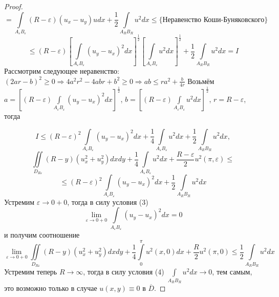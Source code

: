 \documentclass[a4paper, 11pt]{article}
\begin{document}
\begin{proof}
		\begin{equation*}
			= \int\limits_{A_\varepsilon B_\varepsilon} \left(R - \varepsilon \right) \left(u_x - u_y\right)u dx + \dfrac12  \int\limits_{A_R B_R} u^2 dx \leq \{ \text{Неравенство Коши-Буняковского} \}
		\end{equation*}
		\begin{equation*}
			\leq \left(R - \varepsilon\right) \left[\int\limits_{A_\varepsilon B_\varepsilon} \left( u_y - u_x\right)^2 dx \right]^{\frac12} \left[\int\limits_{A_\varepsilon B_\varepsilon} u^2 dx \right]^{\frac12} + \dfrac12 \int\limits_{A_RB_R} u^2 dx = I
		\end{equation*}
		Рассмотрим следующее неравенство: \begin{math}
			\left(2ar -b\right)^2 \geq 0 \Rightarrow 4a^2 r^2 - 4 abr + b^2 \geq 0 \Rightarrow ab \leq r a^2 + \frac{b}{4r}
		\end{math}
	\newline
		Возьмём $ a = \left[ \left(R - \varepsilon \right) \int\limits_{A_\varepsilon B_\varepsilon} \left( u_y - u_x\right)^2 dx \right]^{\frac12}$, $ b = \left[\left(R - \varepsilon\right)\int\limits_{A_\varepsilon B_\varepsilon} u^2 dx \right]^{\frac12}$, $ r = R - \varepsilon$, тогда
		
		\begin{equation*}
			I \leq \left(R - \varepsilon\right)^2 \int\limits_{A_\varepsilon B_\varepsilon} \left( u_y - u_x\right)^2 dx + \dfrac14 \int\limits_{A_\varepsilon B_\varepsilon} u^2 dx +\dfrac12 \int\limits_{A_RB_R} u^2 dx, 
		\end{equation*}
		\begin{equation*}
			\iint\limits_{D_{R\varepsilon}} \left(R - y\right) \left(u_x^2 + u_y^2\right) dx dy + \dfrac{1}{4}\int\limits_{A_\varepsilon B_\varepsilon} u^2 dx +\dfrac{R - \varepsilon}{2}u^2(\pi, \varepsilon) \leq 
		\end{equation*}
		\begin{equation*}
			\leq \left(R - \varepsilon\right)^2 \int\limits_{A_\varepsilon B_\varepsilon} \left( u_y - u_x\right)^2 dx  +\dfrac12 \int\limits_{A_RB_R} u^2 dx
		\end{equation*}
		Устремим $\varepsilon \to 0 + 0$, тогда в силу условия (3)
		\begin{equation*}
			\lim\limits_{\varepsilon \to 0 + 0} \int\limits_{A_\varepsilon B_\varepsilon} \left(u_y - u_x\right)^2 dx = 0
		\end{equation*}
		и получим соотношение
		\begin{equation*}
			\lim\limits_{\varepsilon \to 0 + 0} \iint\limits_{D_{R\varepsilon}} \left(R - y\right) \left(u_x^2 + u_y^2 \right) dx dy + \dfrac14 \int\limits_0^\pi u^2(x,0) dx + \dfrac{R}{2}u^2(\pi,0) \leq \dfrac12 \int\limits_{A_RB_R} u^2 dx
		\end{equation*}
		Устремим теперь $R \to \infty$, тогда  в силу условия (4) $\int\limits_{A_RB_R} u^2 dx \to 0$, тем самым, это возможно только в случае $u(x,y) \equiv 0$ в $\overline{D}$.
	\end{proof}
\end{document}
